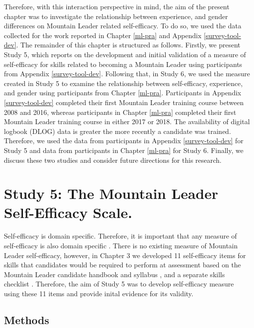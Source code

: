 \documentclass[
  12pt,
  a4paper,
]{book}
\begin{document}
Therefore, with this interaction perspective in mind, the aim of the present chapter was to investigate the relationship between experience, and gender differences on Mountain Leader related self-efficacy. To do so, we used the data collected for the work reported in Chapter \ref{ml-pra} and Appendix \ref{survey-tool-dev}. The remainder of this chapter is structured as follows. Firstly, we present Study 5, which reports on the development and initial validation of a measure of self-efficacy for skills related to becoming a Mountain Leader using participants from Appendix \ref{survey-tool-dev}. Following that, in Study 6, we used the measure created in Study 5 to examine the relationship between self-efficacy, experience, and gender using participants from Chapter \ref{ml-pra}. Participants in Appendix \ref{survey-tool-dev} completed their first Mountain Leader training course between 2008 and 2016, whereas participants in Chapter \ref{ml-pra} completed their first Mountain Leader training course in either 2017 or 2018. The availability of digital logbook (DLOG) data is greater the more recently a candidate was trained. Therefore, we used the data from participants in Appendix \ref{survey-tool-dev} for Study 5 and data from participants in Chapter \ref{ml-pra} for Study 6. Finally, we discuss these two studies and consider future directions for this research.

\hypertarget{study-5}{%
\section{Study 5: The Mountain Leader Self-Efficacy Scale.}\label{study-5}}

Self-efficacy is domain specific. Therefore, it is important that any measure of self-efficacy is also domain specific \citep{Bandura2006}. There is no existing measure of Mountain Leader self-efficacy, however, in Chapter 3 we developed 11 self-efficacy items for skills that candidates would be required to perform at assessment based on the Mountain Leader candidate handbook and syllabus \citep{MountainTrainingUK2015a}, and a separate skills checklist \citep{MountainTrainingUK2015}. Therefore, the aim of Study 5 was to develop self-efficacy measure using these 11 items and provide inital evidence for its validity.

\hypertarget{study5-methods}{%
\subsection{Methods}\label{study5-methods}}
\end{document}
